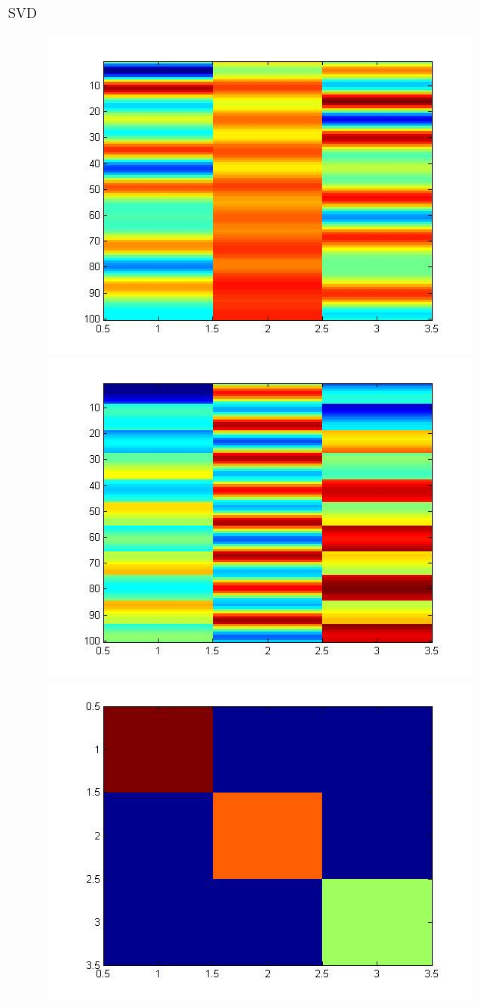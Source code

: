 \documentclass[t,12pt,english
\ifx\beamermode\undefined\else,\beamermode\fi
]{beamer}
\begin{document}
\begin{frame}{SVD}

 \begin{figure}[!htbp]
%
\centering
\includegraphics[width=1\textwidth]{26.jpg}
\endminipage\hfill
{}%
\centering
\includegraphics[width=1\textwidth]{25.jpg}
\endminipage\hfill
{}%
\centering
\includegraphics[width=1\textwidth]{24.jpg}

\end{figure}
\end{frame}
\end{document}
